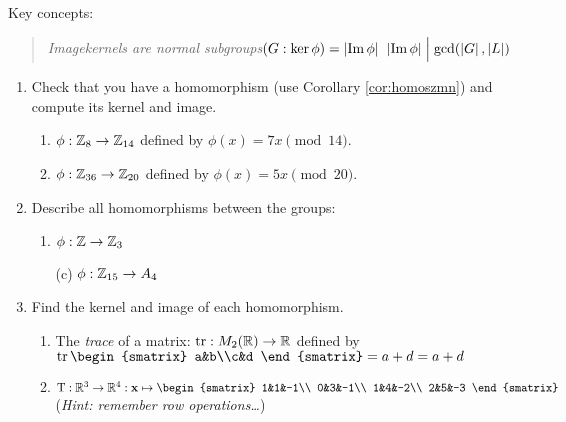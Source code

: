 \begin{exercises}{}{}
Key concepts:
\begin{quote}
	\emph{Image\qquad kernels are normal subgroups\qquad $(G:\ker\phi)=\left| \operatorname{Im}\phi\right|$\qquad
	$\left| \operatorname{Im}\phi\right|\Bigm|\gcd(\left| G\right|,\left| L\right|)$}
\end{quote}


\begin{enumerate}
  \item Check that you have a homomorphism (use Corollary \ref{cor:homoszmn}) and compute its kernel and image.
  \begin{enumerate}
    \item $\phi:\mathbb{Z}_{8}\to\mathbb{Z}_{14}$ defined by $\phi(x)=7x\pmod{14}$.
    
    \item $\phi:\mathbb{Z}_{36}\to\mathbb{Z}_{20}$ defined by $\phi(x)=5x\pmod{20}$.
	\end{enumerate}

	
	\item Describe all homomorphisms between the groups:
	\begin{enumerate}
	  \item {}\lstsp $\phi:\mathbb{Z}\to\mathbb{Z}_3$ 
	  \item[(c)] \lstsp $\phi:\mathbb{Z}_{15}\to A_4$
	\end{enumerate}
	
		
	\item Find the kernel and image of each homomorphism.
	\begin{enumerate}
	  \item The \emph{trace} of a matrix: $\operatorname{tr}:M_2(\mathbb{R})\to\mathbb{R}$ defined by $\tr\smash{\begin{smatrix}
			a&b\\c&d
	  \end{smatrix} =a+d} =a+d$
		
		\item $\rT:\R^3\to\R^4:\vx\mapsto \begin{smatrix}
			1&1&-1\\
			0&3&-1\\
			1&4&-2\\
			2&5&-3
			\end{smatrix}$\quad (\emph{Hint: remember row operations\ldots})
	\end{enumerate}
	
	
	

\end{enumerate}
\end{exercises}
